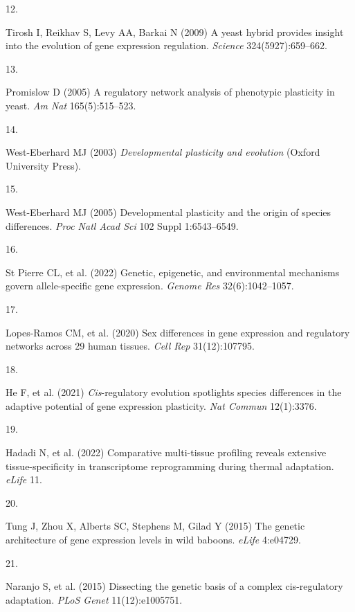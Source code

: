 \documentclass[9pt,twocolumn,twoside,lineno]{pnas-new}
\newlength{\cslhangindent}
\newlength{\csllabelwidth}
\newlength{\cslentryspacingunit} %
\newenvironment{CSLReferences}[2] %
 {%
  \setlength{\parindent}{0pt}
  \ifodd #1
  \let\oldpar\par
  \def\par{\hangindent=\cslhangindent\oldpar}
  \fi
  \setlength{\parskip}{#2\cslentryspacingunit}
 }%
 {}
\newcommand{\CSLLeftMargin}[1]{\parbox[t]{\csllabelwidth}{#1}}
\newcommand{\CSLRightInline}[1]{\parbox[t]{\linewidth - \csllabelwidth}{#1}\break}
\begin{document}
\begin{CSLReferences}{0}{0}
\leavevmode\hypertarget{ref-Tirosh2009}{}%
\CSLLeftMargin{12. }
\CSLRightInline{Tirosh I, Reikhav S, Levy AA, Barkai N (2009) A yeast
hybrid provides insight into the evolution of gene expression
regulation. \emph{Science} 324(5927):659--662.}

\leavevmode\hypertarget{ref-Promislow2005}{}%
\CSLLeftMargin{13. }
\CSLRightInline{Promislow D (2005) A regulatory network analysis of
phenotypic plasticity in yeast. \emph{Am Nat} 165(5):515--523.}

\leavevmode\hypertarget{ref-West-Eberhard2003}{}%
\CSLLeftMargin{14. }
\CSLRightInline{West-Eberhard MJ (2003) \emph{Developmental plasticity
and evolution} (Oxford University Press).}

\leavevmode\hypertarget{ref-West-Eberhard2005}{}%
\CSLLeftMargin{15. }
\CSLRightInline{West-Eberhard MJ (2005) Developmental plasticity and the
origin of species differences. \emph{Proc Natl Acad Sci} 102 Suppl
1:6543--6549.}

\leavevmode\hypertarget{ref-St_Pierre2022}{}%
\CSLLeftMargin{16. }
\CSLRightInline{St Pierre CL, et al. (2022) Genetic, epigenetic, and
environmental mechanisms govern allele-specific gene expression.
\emph{Genome Res} 32(6):1042--1057.}

\leavevmode\hypertarget{ref-Lopes-Ramos2020}{}%
\CSLLeftMargin{17. }
\CSLRightInline{Lopes-Ramos CM, et al. (2020) Sex differences in gene
expression and regulatory networks across 29 human tissues. \emph{Cell
Rep} 31(12):107795.}

\leavevmode\hypertarget{ref-He2021}{}%
\CSLLeftMargin{18. }
\CSLRightInline{He F, et al. (2021) \emph{Cis}-regulatory evolution
spotlights species differences in the adaptive potential of gene
expression plasticity. \emph{Nat Commun} 12(1):3376.}

\leavevmode\hypertarget{ref-Hadadi2022}{}%
\CSLLeftMargin{19. }
\CSLRightInline{Hadadi N, et al. (2022) Comparative multi-tissue
profiling reveals extensive tissue-specificity in transcriptome
reprogramming during thermal adaptation. \emph{eLife} 11.}

\leavevmode\hypertarget{ref-Tung2015}{}%
\CSLLeftMargin{20. }
\CSLRightInline{Tung J, Zhou X, Alberts SC, Stephens M, Gilad Y (2015)
The genetic architecture of gene expression levels in wild baboons.
\emph{eLife} 4:e04729.}

\leavevmode\hypertarget{ref-Naranjo2015}{}%
\CSLLeftMargin{21. }
\CSLRightInline{Naranjo S, et al. (2015) Dissecting the genetic basis of
a complex cis-regulatory adaptation. \emph{PLoS Genet} 11(12):e1005751.}


\end{CSLReferences}
\end{document}
